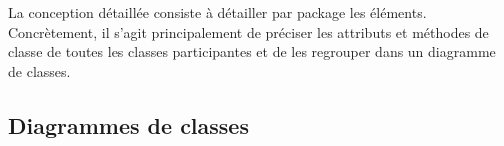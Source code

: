 \par La conception détaillée consiste à détailler par package les éléments. Concrètement, il s’agit principalement de préciser les attributs et méthodes de classe de toutes les classes participantes et de les regrouper dans un diagramme de classes.

	\subsection{Diagrammes de classes}

